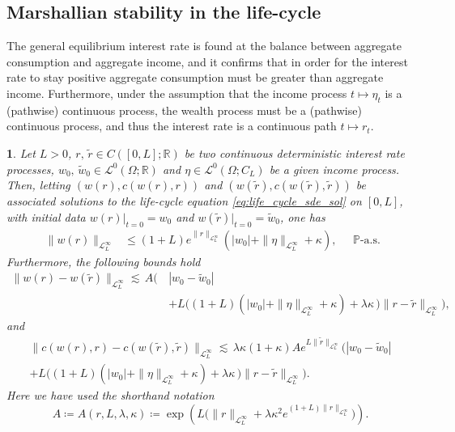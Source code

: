 \documentclass[11pt,oneside,english,reqno,dvipsnames,table]{amsart}
\numberwithin{equation}{section}
\theoremstyle{plain}
\theoremstyle{definition}
\theoremstyle{remark}
\theoremstyle{plain}
\newtheorem{lem}[thm]{\protect\lemmaname}
\theoremstyle{plain}
\theoremstyle{plain}
\theoremstyle{plain}
\theoremstyle{plain}
\theoremstyle{plain}
\theoremstyle{plain}
\providecommand{\lemmaname}{Lemma}
\newcommand{\mbP}{\mathbb{P}}
\newcommand{\mbR}{\mathbb{R}}
\newcommand{\msL}{\mathscr{L}}
\newcommand{\tzero}{|_{t=0}}
\numberwithin{thm}{section}
\begin{document}
\subsection{Marshallian stability in the life-cycle}


The general equilibrium interest rate is found at the balance between aggregate consumption and aggregate income, and it confirms that in order for the interest rate to stay positive  aggregate consumption must be greater than aggregate income.
Furthermore, under the assumption that the  income process $t\mapsto \eta_t$ is a 
 (pathwise) continuous process, the wealth process must be a (pathwise) continuous process, and thus the interest rate is a continuous path $t\mapsto r_t$.  


%
\begin{lem}\label{lem:LC_rate_stable} Let $L>0$, $r,\,\tilde{r} \in C([0,L];\mbR)$ be two continuous deterministic interest rate processes, $w_0,\,\tilde{w}_0 \in \msL^0(\Omega;\mbR)$ and $\eta \in \msL^0(\Omega;C_L)$ be a given income process. Then, letting $(w(r),c(w(r),r))$ and $(w(\tilde{r}),c(w(\tilde{r}),\tilde{r}))$ be associated solutions to the life-cycle equation \eqref{eq:life_cycle_sde_sol} on $[0,L]$, with initial data $w(r)\tzero=w_0$ and $w(\tilde{r})\tzero =\tilde{w}_0$, one has
%
%
\begin{equation}\label{eq:wealth_apriori_bound}
\begin{aligned}
     \|w(r)\|_{\msL^\infty_L}  &\leq  (1+L)e^{\|r\|_{\msL^\infty_L}} \left(|w_0| +  \|\eta\|_{\msL^\infty_L}+ \kappa \right),
\end{aligned}
     \quad \mbP\text{-a.s.}
    \end{equation}
%
%
Furthermore, the following bounds hold
%
\begin{equation}\label{eq:wealth_rate_stability}
\begin{aligned}
    \|w(r)-w(\tilde{r})\|_{\msL^\infty_L} \lesssim \,A \bigg( \, &|w_0-\tilde{w}_0|\\
    &+ L\bigg( (1+L)\left(|w_0| +  \|\eta\|_{\msL^\infty_L}+ \kappa \right)  +  \lambda  \kappa \, \bigg)\|r-\tilde{r}\|_{\msL^\infty_L}\bigg),
    \end{aligned}
\end{equation}
%
and
%
\begin{multline}\label{eq:consump_rate_stability}
     \|c(w(r),r)-c(w(\tilde{r}),\tilde{r})\|_{\msL^\infty_L} \lesssim \, \lambda \kappa (1+\kappa) Ae^{L\|\tilde{r}\|_{\msL^\infty_L}}   \bigg( |w_0-\tilde{w}_0|\\
     	+ L\bigg( (1+L)\left(|w_0| +  \|\eta\|_{\msL^\infty_L} + \kappa \right)  +  \lambda  \kappa \, \bigg)\|r-\tilde{r}\|_{\msL^\infty_L} \bigg).
\end{multline}
Here we have used the shorthand notation
%
\begin{equation*}
    A\coloneqq A(r,L,\lambda,\kappa) \coloneqq \exp\left(L\Big(\|r\|_{\msL^\infty_L} + \lambda \kappa^2 e^{(1+L)\|r\|_{\msL^\infty_L}  }\Big) \right).
\end{equation*}



   \end{lem}
\end{document}
